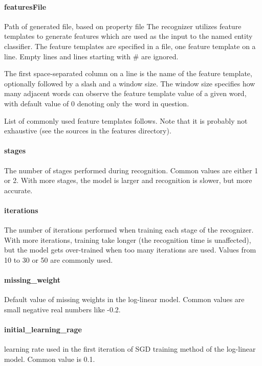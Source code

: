 \documentclass[12pt,a4paper]{report}
\begin{document}
\paragraph{featuresFile}
Path of generated file, based on property file 
The recognizer utilizes feature templates to generate features which are used as the input to the named entity classifier. The feature templates are specified in a file, one feature template on a line. Empty lines and lines starting with \# are ignored.

The first space-separated column on a line is the name of the feature template, optionally followed by a slash and a window size. The window size specifies how many adjacent words can observe the feature template value of a given word, with default value of 0 denoting only the word in question.

List of commonly used feature templates follows. Note that it is probably not exhaustive (see the sources in the features directory).

\paragraph{stages}
The number of stages performed during recognition. Common values are either 1 or 2. With more stages, the model is larger and recognition is slower, but more accurate.

\paragraph{iterations}
The number of iterations performed when training each stage of the recognizer. With more iterations, training take longer (the recognition time is unaffected), but the model gets over-trained when too many iterations are used. Values from 10 to 30 or 50 are commonly used.

\paragraph{missing\_weight}
Default value of missing weights in the log-linear model. Common values are small negative real numbers like -0.2.

\paragraph{initial\_learning\_rage}
learning rate used in the first iteration of SGD training method of the log-linear model. Common value is 0.1.
\end{document}
